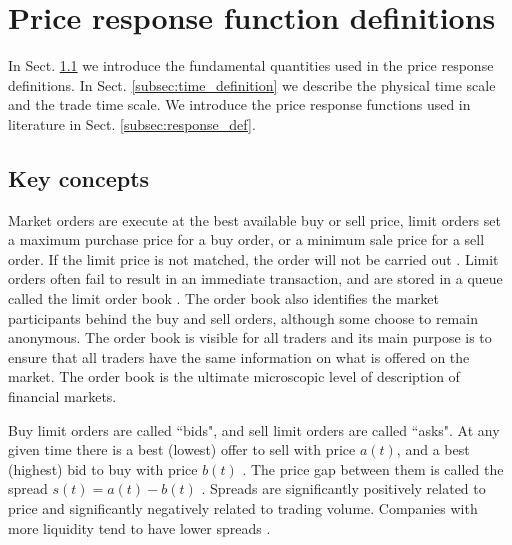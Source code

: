 \section{Price response function definitions}
\label{sec:response_functions_def}

In Sect. \ref{subsec:key_concepts} we introduce the fundamental quantities used
in the price response definitions. In Sect. \ref{subsec:time_definition} we
describe the physical time scale and the trade time scale. We introduce the
price response functions used in literature in Sect. \ref{subsec:response_def}.

\subsection{Key concepts}\label{subsec:key_concepts}

Market orders are execute at the best available buy or sell price, limit orders
set a maximum purchase price for a buy order, or a minimum sale price for a
sell order. If the limit price is not matched, the order will not be carried
out
\cite{large_prices_changes,predictive_pow,intro_market_micro,stat_theory}.
Limit orders often fail to result in an immediate transaction, and are stored
in a queue called the limit order book
\cite{prop_order_book,stat_prop,predictive_pow,intro_market_micro}. The order
book also identifies the market participants behind the buy and sell orders,
although some choose to remain anonymous. The order book is visible for all
traders and its main purpose is to ensure that all traders have the same
information on what is offered on the market. The order book is the ultimate
microscopic level of description of financial markets.

Buy limit orders are called ``bids", and sell limit orders are called ``asks".
At any given time there is a best (lowest) offer to sell with price
$a\left(t\right)$, and a best (highest) bid to buy with price $b\left(t\right)$
\cite{prop_order_book,subtle_nature,account_spread,limit_ord_spread,stat_theory}.
The price gap between them is called the spread
$s\left(t\right) = a\left(t\right)-b\left(t\right)$
\cite{subtle_nature,market_digest,Bouchaud_2004,account_spread,em_stylized_facts,large_prices_changes,stat_theory}.
Spreads are significantly positively related to price and significantly
negatively related to trading volume. Companies with more liquidity tend to
have lower spreads
\cite{components_spread_tokyo,effects_spread,account_spread,components_spread}.

